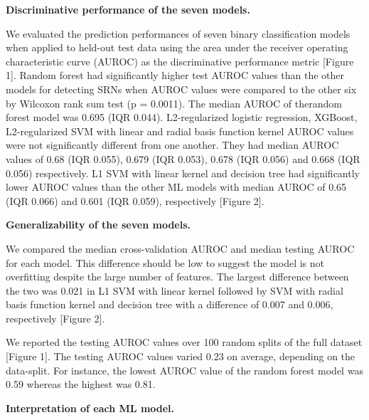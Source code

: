 \documentclass[11pt,]{article}
\begin{document}
\textbf{Discriminative performance of the seven models.}

We evaluated the prediction performances of seven binary classification
models when applied to held-out test data using the area under the
receiver operating characteristic curve (AUROC) as the discriminative
performance metric {[}Figure 1{]}. Random forest had significantly
higher test AUROC values than the other models for detecting SRNs when
AUROC values were compared to the other six by Wilcoxon rank sum test (p
= 0.0011). The median AUROC of therandom forest model was 0.695 (IQR
0.044). L2-regularized logistic regression, XGBoost, L2-regularized SVM
with linear and radial basis function kernel AUROC values were not
significantly different from one another. They had median AUROC values
of 0.68 (IQR 0.055), 0.679 (IQR 0.053), 0.678 (IQR 0.056) and 0.668 (IQR
0.056) respectively. L1 SVM with linear kernel and decision tree had
significantly lower AUROC values than the other ML models with median
AUROC of 0.65 (IQR 0.066) and 0.601 (IQR 0.059), respectively {[}Figure
2{]}.

\textbf{Generalizability of the seven models.}

We compared the median cross-validation AUROC and median testing AUROC
for each model. This difference should be low to suggest the model is
not overfitting despite the large number of features. The largest
difference between the two was 0.021 in L1 SVM with linear kernel
followed by SVM with radial basis function kernel and decision tree with
a difference of 0.007 and 0.006, respectively {[}Figure 2{]}.

We reported the testing AUROC values over 100 random splits of the full
dataset {[}Figure 1{]}. The testing AUROC values varied 0.23 on average,
depending on the data-split. For instance, the lowest AUROC value of the
random forest model was 0.59 whereas the highest was 0.81.

\textbf{Interpretation of each ML model.}
\end{document}
